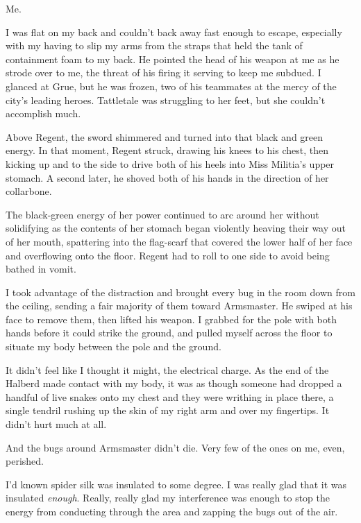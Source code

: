 Me.



I was flat on my back and couldn't back away fast enough to escape, especially with my having to slip my arms from the straps that held the tank of containment foam to my back.  He pointed the head of his weapon at me as he strode over to me, the threat of his firing it serving to keep me subdued.  I glanced at Grue, but he was frozen, two of his teammates at the mercy of the city's leading heroes.  Tattletale was struggling to her feet, but she couldn't accomplish much.



Above Regent, the sword shimmered and turned into that black and green energy.  In that moment, Regent struck, drawing his knees to his chest, then kicking up and to the side to drive both of his heels into Miss Militia's upper stomach.  A second later, he shoved both of his hands in the direction of her collarbone.



The black-green energy of her power continued to arc around her without solidifying as the contents of her stomach began violently heaving their way out of her mouth, spattering into the flag-scarf that covered the lower half of her face and overflowing onto the floor.  Regent had to roll to one side to avoid being bathed in vomit.



I took advantage of the distraction and brought every bug in the room down from the ceiling, sending a fair majority of them toward Armsmaster.  He swiped at his face to remove them, then lifted his weapon.  I grabbed for the pole with both hands before it could strike the ground, and pulled myself across the floor to situate my body between the pole and the ground.



It didn't feel like I thought it might, the electrical charge.  As the end of the Halberd made contact with my body, it was as though someone had dropped a handful of live snakes onto my chest and they were writhing in place there, a single tendril rushing up the skin of my right arm and over my fingertips.  It didn't hurt much at all.



And the bugs around Armsmaster didn't die.  Very few of the ones on me, even, perished.



I'd known spider silk was insulated to some degree.  I was really glad that it was insulated \emph{enough}.  Really, really glad my interference was enough to stop the energy from conducting through the area and zapping the bugs out of the air.



